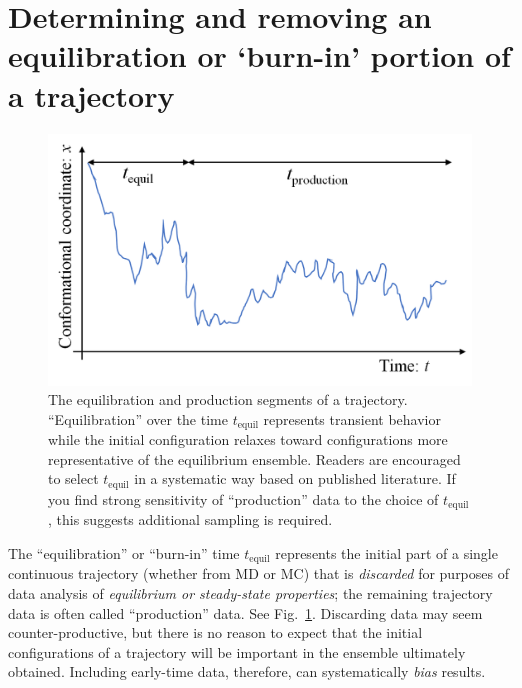 
\section{Determining and removing an equilibration or `burn-in' portion of a trajectory}
\label{sec:equil}

\begin{figure}
  \centering
  \includegraphics[width=0.9\linewidth]{figures/tequil-time-trace}
  \caption{
  \label{fig:tequil}
  The equilibration and production segments of a trajectory.
  ``Equilibration'' over the time $t_{\mathrm{equil}}$ represents transient behavior while the initial configuration relaxes toward configurations more representative of the equilibrium ensemble.
  Readers are encouraged to select $t_{\mathrm{equil}}$ in a systematic way based on published literature.
  If you find strong sensitivity of ``production'' data to the choice of $t_{\mathrm{equil}}$, this suggests additional sampling is required.
  }
\end{figure}

The ``equilibration'' or ``burn-in'' time $t_{\mathrm{equil}}$ represents the initial part of a single continuous trajectory (whether from MD or MC) that is \emph{discarded} for purposes of data analysis of \emph{equilibrium or steady-state properties};
the remaining trajectory data is often called ``production'' data.
See Fig.\ \ref{fig:tequil}.
Discarding data may seem counter-productive, but there is no reason to expect that the initial configurations of a trajectory will be important in the ensemble ultimately obtained.
Including early-time data, therefore, can systematically \emph{bias} results.

